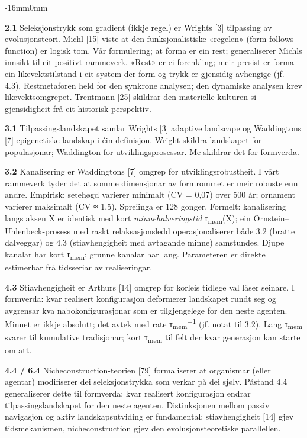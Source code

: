 \documentclass[10pt,oneside]{book}
\newcommand{\msym}[1]{{\mathfbfont #1}}
\newenvironment{widebody}{%
  \begin{adjustwidth}{-16mm}{0mm}%
}{%
  \end{adjustwidth}%
}
\begin{document}
\begin{widebody}
{\textbf{2.1} Seleksjonstrykk som gradient (ikkje regel) er Wrights [3] tilpassing av evolusjonsteori. Michl [15] viste at den funksjonalistiske «regelen» (form follows function) er logisk tom. Vår formulering; at forma er ein rest; generaliserer Michls innsikt til eit positivt rammeverk. «Rest» er ei forenkling; meir presist er forma ein likevektstilstand i eit system der form og trykk er gjensidig avhengige (jf. 4.3). Restmetaforen held for den synkrone analysen; den dynamiske analysen krev likevektsomgrepet. Trentmann [25] skildrar den materielle kulturen si gjensidigheit frå eit historisk perspektiv.

\textbf{3.1} Tilpassingslandskapet samlar Wrights [3] adaptive landscape og Waddingtons [7] epigenetiske landskap i éin definisjon. Wright skildra landskapet for populasjonar; Waddington for utviklingsprosessar. Me skildrar det for formverda.

\textbf{3.2} Kanalisering er Waddingtons [7] omgrep for utviklingsrobustheit. I vårt rammeverk tyder det at somme dimensjonar av formrommet er meir robuste enn andre. Empirisk: setehøgd varierer minimalt (CV = 0,07) over 500 år; ornament varierer maksimalt (CV \msym{≈} 1,5). Spreiinga er 128 gonger. Formelt: kanalisering langs aksen X er identisk med kort \textit{minnehalveringstid} \msym{τ}\textsubscript{mem}(X); ein Ornstein--Uhlenbeck-prosess med raskt relaksasjonsledd operasjonaliserer både 3.2 (bratte dalveggar) og 4.3 (stiavhengigheit med avtagande minne) samstundes. Djupe kanalar har kort \msym{τ}\textsubscript{mem}; grunne kanalar har lang. Parameteren er direkte estimerbar frå tidsseriar av realiseringar.

\textbf{4.3} Stiavhengigheit er Arthurs [14] omgrep for korleis tidlege val låser seinare. I formverda: kvar realisert konfigurasjon deformerer landskapet rundt seg og avgrensar kva nabokonfigurasjonar som er tilgjengelege for den neste agenten. Minnet er ikkje absolutt; det avtek med rate \msym{τ}\textsubscript{mem}\textsuperscript{\msym{−}1} (jf. notat til 3.2). Lang \msym{τ}\textsubscript{mem} svarer til kumulative tradisjonar; kort \msym{τ}\textsubscript{mem} til felt der kvar generasjon kan starte om att.

\textbf{4.4 / 6.4} Nicheconstruction-teorien [79] formaliserer at organismar (eller agentar) modifiserer dei seleksjonstrykka som verkar på dei sjølv. Påstand 4.4 generaliserer dette til formverda: kvar realisert konfigurasjon endrar tilpassingslandskapet for den neste agenten. Distinksjonen mellom passiv navigasjon og aktiv landskapsutviding er fundamental: stiavhengigheit [14] gjev tids\-mekanismen, nicheconstruction gjev den evolusjonsteoretiske parallellen.

}
\end{widebody}
\end{document}

